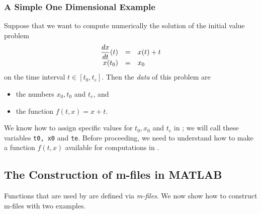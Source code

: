 \subsubsection*{A Simple One Dimensional Example}

Suppose that we want to compute numerically the solution of the initial value 
problem
\arraystart
\begin{equation}   \label{eq:fexam}
\begin{array}{rcl}
\displaystyle \frac{dx}{dt}(t) & = & x(t)+t \\
x(t_0) & = & x_0
\end{array}
\end{equation}
\arrayfinish
on the time interval $t\in [t_0,t_e]$.  Then the {\em data\/} of this 
problem are 
\begin{itemize}
\item the numbers $x_0,t_0$ and $t_e$, and 
\item the function $f(t,x)=x+t$.  
\end{itemize}
We know how to assign specific values for $t_0,x_0$ and $t_e$ in \Matlabp;
we will call these variables {\tt t0, x0} and {\tt te}.  Before proceeding, 
we need to understand how to make a function $f(t,x)$ available for 
computations in \Matlabp.

\subsection*{The Construction of m-files in MATLAB}

Functions that are used by \Matlab are defined via 
{\em m-files}.  We now show how to construct m-files with two examples.


